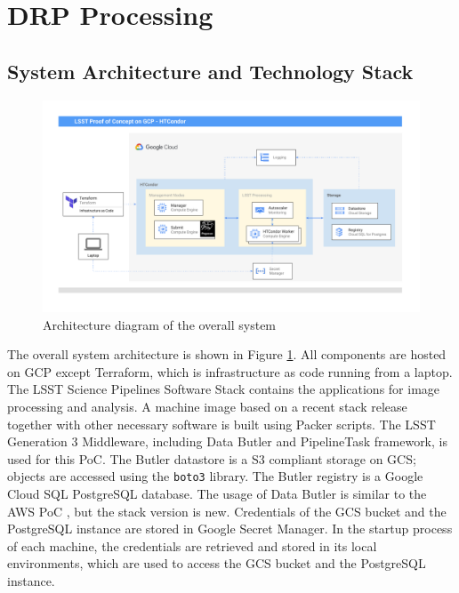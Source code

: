 
\section{DRP Processing} \label{sec:drp}
\subsection{System Architecture and Technology Stack}

\begin{figure}[h]
\centering
\includegraphics[width=1.0\textwidth]{HTCondor_Architecture.pdf}
\caption{Architecture diagram of the overall system}
\label{fig:architecture}
\end{figure}

The overall system architecture is shown in Figure \ref{fig:architecture}.
All components are hosted on GCP except Terraform, which is infrastructure as code running from a laptop.
The LSST Science Pipelines Software Stack contains the applications for image processing and analysis.
A machine image based on a recent stack release together with other necessary software is built using Packer scripts.
The LSST Generation 3 Middleware, including Data Butler and PipelineTask framework, is used for this PoC.
The Butler datastore is a S3 compliant storage on GCS; objects are accessed using the \texttt{boto3} library.
The Butler registry is a Google Cloud SQL PostgreSQL database.
The usage of Data Butler is similar to the AWS PoC , but the stack version is new.
Credentials of the GCS bucket and the PostgreSQL instance are stored in Google Secret Manager.
In the startup process of each machine, the credentials are retrieved and stored in its local environments, which are used to access the GCS bucket and the PostgreSQL instance.


